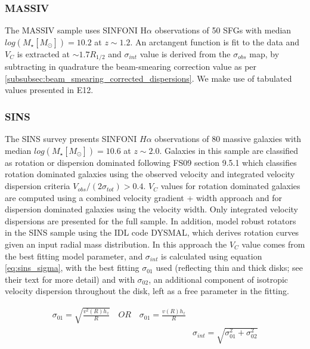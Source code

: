 \documentclass[fleqn,usenatbib]{mn2e}
\begin{document}
\subsubsection{MASSIV}\label{subsubsec:MASSIV}
The MASSIV sample \citep[E12]{Epinat2012} uses SINFONI H$\alpha$ observations of 50 SFGs with median $log(M_{\star}[M_{\odot}])=10.2$ at $z\sim1.2$.
An arctangent function is fit to the data and $V_{C}$ is extracted at $\sim1.7R_{1/2}$ and $\sigma_{int}$ value is derived from the $\sigma_{obs}$ map, by subtracting in quadrature the beam-smearing correction value as per \cref{subsubsec:beam_smearing_corrected_dispersions}.
We make use of tabulated values presented in E12.

\subsubsection{SINS}\label{subsubsec:SINS}
The SINS survey \citep[FS09]{ForsterSchreiber2009} presents SINFONI $H\alpha$ observations of 80 massive galaxies with median $log(M_{\star}[M_{\odot}])=10.6$ at $z\sim2.0$.
Galaxies in this sample are classified as rotation or dispersion dominated following FS09 section 9.5.1 which classifies rotation dominated galaxies using the observed velocity and integrated velocity dispersion criteria $V_{obs}/(2\sigma_{tot}) > 0.4$.
$V_{C}$ values for rotation dominated galaxies are computed using a combined velocity gradient + width approach \citep{ForsterSchreiber2006} and for dispersion dominated galaxies using the velocity width.
Only integrated velocity dispersions are presented for the full sample.
In addition, \cite[C09]{Cresci2009} model robust rotators in the SINS sample using the IDL code DYSMAL, which derives rotation curves given an input radial mass distribution.
In this approach the $V_{C}$ value comes from the best fitting model parameter, and $\sigma_{int}$ is calculated using equation \ref{eq:sins_sigma}, with the best fitting $\sigma_{01}$ used (reflecting thin and thick disks; see their text for more detail) and with $\sigma_{02}$, an additional component of isotropic velocity dispersion throughout the disk, left as a free parameter in the fitting.

\begin{equation}\label{eq:sins_sigma}
\begin{split}
\sigma_{01} = \sqrt{\frac{v^{2}(R)h_{z}}{R}} \quad OR \quad \sigma_{01} = \frac{v(R)h_{z}}{R} \\
& \sigma_{int} = \sqrt{\sigma_{01}^{2} + \sigma_{02}^{2}}
\end{split}
\end{equation}
\end{document}
